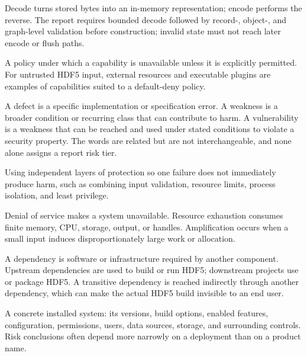\documentclass[../main.tex]{subfiles}
\begin{document}
\begin{description}[leftmargin=1.5em,style=nextline]
\item[Decode / encode.]
Decode turns stored bytes into an in-memory representation; encode performs the
reverse. The report requires bounded decode followed by record-, object-, and
graph-level validation before construction; invalid state must not reach later
encode or flush paths.

\item[Default deny.]
A policy under which a capability is unavailable unless it is explicitly
permitted. For untrusted HDF5 input, external resources and executable plugins
are examples of capabilities suited to a default-deny policy.

\item[Defect / weakness / vulnerability.]
A defect is a specific implementation or specification error. A weakness is a
broader condition or recurring class that can contribute to harm. A
vulnerability is a weakness that can be reached and used under stated
conditions to violate a security property. The words are related but are not
interchangeable, and none alone assigns a report risk tier.

\item[Defense in depth.]
Using independent layers of protection so one failure does not immediately
produce harm, such as combining input validation, resource limits, process
isolation, and least privilege.

\item[Denial of service / resource exhaustion / amplification.]
Denial of service makes a system unavailable. Resource exhaustion consumes
finite memory, CPU, storage, output, or handles. Amplification occurs when a
small input induces disproportionately large work or allocation.

\item[Dependency / upstream / downstream / transitive dependency.]
A dependency is software or infrastructure required by another component.
Upstream dependencies are used to build or run HDF5; downstream projects use or
package HDF5. A transitive dependency is reached indirectly through another
dependency, which can make the actual HDF5 build invisible to an end user.

\item[Deployment.]
A concrete installed system: its versions, build options, enabled features,
configuration, permissions, users, data sources, storage, and surrounding
controls. Risk conclusions often depend more narrowly on a deployment than on
a product name.


\end{description}
\end{document}
